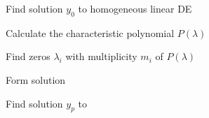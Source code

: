 \begin{compactenum}
    \item Find solution $y_0$ to homogeneous linear DE
        \begin{compactitem}
            \item Calculate the characteristic polynomial $P(\lambda)$
            \item Find zeros $\lambda_i$ with multiplicity $m_i$ of $P(\lambda)$
            \item Form solution 
        \end{compactitem}
    \item Find solution $y_p$ to 
\end{compactenum}
